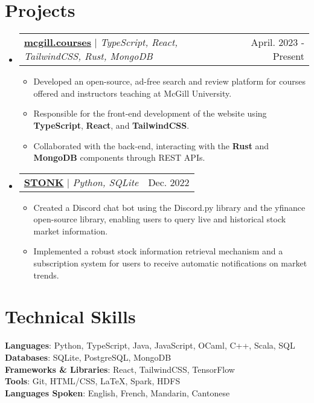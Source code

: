 \documentclass[letterpaper,11pt]{article}
\makeatletter
\newcommand{\resumeItem}[1]{
  \item\small{
    {#1 \vspace{-2pt}}
  }
}
\newcommand{\resumeProjectHeading}[2]{
  \item
  \begin{tabular*}{0.97\textwidth}{l@{\extracolsep{\fill}}r}
    \small#1 & #2 \\
  \end{tabular*}\vspace{-7pt}
}
\newcommand{\resumeSubHeadingListStart}{\begin{itemize}[leftmargin=0.15in, label={}]}
\newcommand{\resumeSubHeadingListEnd}{\end{itemize}}
\newcommand{\resumeItemListStart}{\begin{itemize}}
\newcommand{\resumeItemListEnd}{\end{itemize}\vspace{-5pt}}
\makeatother
\begin{document}
\section{Projects}
\resumeSubHeadingListStart

\resumeProjectHeading
{\href{https://mcgill.courses}{\textbf{mcgill.courses}} $|$ \emph{TypeScript, React, TailwindCSS, Rust, MongoDB}}{April. 2023 - Present}
\resumeItemListStart
\resumeItem{Developed an open-source, ad-free search and review platform for courses offered and instructors teaching at McGill University.}
\resumeItem{Responsible for the front-end development of the website using \textbf{TypeScript}, \textbf{React}, and \textbf{TailwindCSS}.}
\resumeItem{Collaborated with the back-end, interacting with the \textbf{Rust} and \textbf{MongoDB} components through REST APIs.}
\resumeItemListEnd

\resumeProjectHeading
{\href{https://github.com/SamZhang02/STONK}{\textbf{STONK}} $|$ \emph{Python, SQLite}}{Dec. 2022}
\resumeItemListStart
\resumeItem{Created a Discord chat bot using the Discord.py library and the yfinance open-source library, enabling users to query live and historical stock market information.}
\resumeItem{Implemented a robust stock information retrieval mechanism and a subscription system for users to receive automatic notifications on market trends.}
\resumeItemListEnd

\resumeSubHeadingListEnd

\section{Technical Skills}
\begin{itemize}[leftmargin=0.15in, label={}]
  \small{\item{
                \textbf{Languages}{: Python, TypeScript, Java, JavaScript, OCaml, C++, Scala, SQL} \\
                \textbf{Databases}{: SQLite, PostgreSQL, MongoDB}\\
                \textbf{Frameworks \& Libraries}{: React, TailwindCSS, TensorFlow}\\
                \textbf{Tools}{: Git, HTML/CSS, \LaTeX, Spark, HDFS}\\
                \textbf{Languages Spoken}{: English, French, Mandarin, Cantonese}\\
          }}
\end{itemize}
\end{document}
